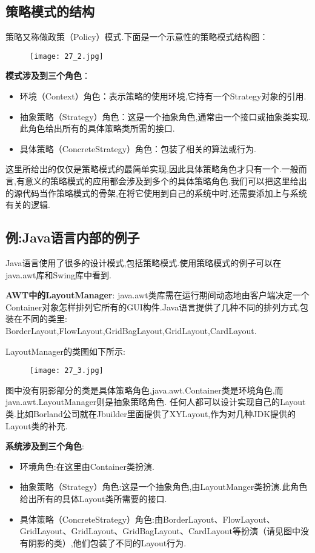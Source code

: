 \documentclass[../main.tex]{subfiles}
\begin{document}
\subsection{策略模式的结构}
策略又称做政策（Policy）模式.下面是一个示意性的策略模式结构图：
%
\begin{figure}[H]
  \texttt{[image: 27\_2.jpg]}
\end{figure}
%
\textbf{模式涉及到三个角色}：
\begin{itemize}
  \item 环境（Context）角色：表示策略的使用环境,它持有一个Strategy对象的引用.
  \item 抽象策略（Strategy）角色：这是一个抽象角色,通常由一个接口或抽象类实现.此角色给出所有的具体策略类所需的接口.
  \item 具体策略（ConcreteStrategy）角色：包装了相关的算法或行为.
\end{itemize}
%



%
这里所给出的仅仅是策略模式的最简单实现,因此具体策略角色才只有一个.一般而言,有意义的策略模式的应用都会涉及到多个的具体策略角色.我们可以把这里给出的源代码当作策略模式的骨架,在将它使用到自己的系统中时,还需要添加上与系统有关的逻辑.
%
\subsection{例:Java语言内部的例子}
\noindent Java语言使用了很多的设计模式,包括策略模式.使用策略模式的例子可以在java.awt库和Swing库中看到.

\textbf{AWT中的LayoutManager}:
java.awt类库需在运行期间动态地由客户端决定一个Container对象怎样排列它所有的GUI构件.Java语言提供了几种不同的排列方式,包装在不同的类里:
BorderLayout,FlowLayout,GridBagLayout,GridLayout,CardLayout.

LayoutManager的类图如下所示:
%
\begin{figure}[H]
  \texttt{[image: 27\_3.jpg]}
\end{figure}
%
图中没有阴影部分的类是具体策略角色,java.awt.Container类是环境角色,而java.awt.LayoutManager则是抽象策略角色.
任何人都可以设计实现自己的Layout类.比如Borland公司就在Jbuilder里面提供了XYLayout,作为对几种JDK提供的Layout类的补充.

\textbf{系统涉及到三个角色}:
%
\begin{itemize}
  \item 环境角色:在这里由Container类扮演.
  \item 抽象策略（Strategy）角色:这是一个抽象角色,由LayoutManger类扮演.此角色给出所有的具体Layout类所需要的接口.
  \item 具体策略（ConcreteStrategy）角色:由BorderLayout、FlowLayout、GridLayout、GridLayout、GridBagLayout、CardLayout等扮演（请见图中没有阴影的类）,他们包装了不同的Layout行为.
\end{itemize}
%
\end{document}
